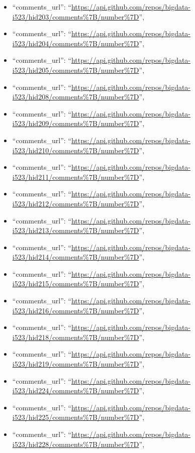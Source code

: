 \begin{itemize}
\item
  ``comments\_url'':
  ``\url{https://api.github.com/repos/bigdata-i523/hid203/comments\%7B/number\%7D}'',
\item
  ``comments\_url'':
  ``\url{https://api.github.com/repos/bigdata-i523/hid204/comments\%7B/number\%7D}'',
\item
  ``comments\_url'':
  ``\url{https://api.github.com/repos/bigdata-i523/hid205/comments\%7B/number\%7D}'',
\item
  ``comments\_url'':
  ``\url{https://api.github.com/repos/bigdata-i523/hid208/comments\%7B/number\%7D}'',
\item
  ``comments\_url'':
  ``\url{https://api.github.com/repos/bigdata-i523/hid209/comments\%7B/number\%7D}'',
\item
  ``comments\_url'':
  ``\url{https://api.github.com/repos/bigdata-i523/hid210/comments\%7B/number\%7D}'',
\item
  ``comments\_url'':
  ``\url{https://api.github.com/repos/bigdata-i523/hid211/comments\%7B/number\%7D}'',
\item
  ``comments\_url'':
  ``\url{https://api.github.com/repos/bigdata-i523/hid212/comments\%7B/number\%7D}'',
\item
  ``comments\_url'':
  ``\url{https://api.github.com/repos/bigdata-i523/hid213/comments\%7B/number\%7D}'',
\item
  ``comments\_url'':
  ``\url{https://api.github.com/repos/bigdata-i523/hid214/comments\%7B/number\%7D}'',
\item
  ``comments\_url'':
  ``\url{https://api.github.com/repos/bigdata-i523/hid215/comments\%7B/number\%7D}'',
\item
  ``comments\_url'':
  ``\url{https://api.github.com/repos/bigdata-i523/hid216/comments\%7B/number\%7D}'',
\item
  ``comments\_url'':
  ``\url{https://api.github.com/repos/bigdata-i523/hid218/comments\%7B/number\%7D}'',
\item
  ``comments\_url'':
  ``\url{https://api.github.com/repos/bigdata-i523/hid219/comments\%7B/number\%7D}'',
\item
  ``comments\_url'':
  ``\url{https://api.github.com/repos/bigdata-i523/hid224/comments\%7B/number\%7D}'',
\item
  ``comments\_url'':
  ``\url{https://api.github.com/repos/bigdata-i523/hid225/comments\%7B/number\%7D}'',
\item
  ``comments\_url'':
  ``\url{https://api.github.com/repos/bigdata-i523/hid228/comments\%7B/number\%7D}'',

\end{itemize}
